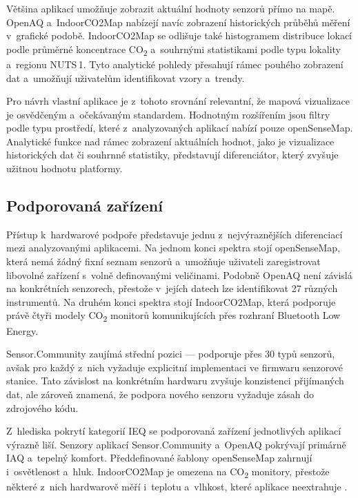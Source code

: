 Většina aplikací umožňuje zobrazit aktuální hodnoty senzorů přímo na mapě. OpenAQ a~IndoorCO2Map nabízejí navíc zobrazení historických průběhů měření v~grafické podobě. IndoorCO2Map se odlišuje také histogramem distribuce lokací podle průměrné koncentrace CO\textsubscript{2} a~souhrnými statistikami podle typu lokality a~regionu NUTS\,1. Tyto analytické pohledy přesahují rámec pouhého zobrazení dat a~umožňují uživatelům identifikovat vzory a~trendy.

Pro návrh vlastní aplikace je z~tohoto srovnání relevantní, že mapová vizualizace je osvědčeným a~očekávaným standardem. Hodnotným rozšířením jsou filtry podle typu prostředí, které z~analyzovaných aplikací nabízí pouze openSenseMap. Analytické funkce nad rámec zobrazení aktuálních hodnot, jako je vizualizace historických dat či souhrnné statistiky, představují diferenciátor, který zvyšuje užitnou hodnotu platformy.

\FloatBarrier
\subsection{Podporovaná zařízení}

Přístup k~hardwarové podpoře představuje jednu z~nejvýraznějších diferenciací mezi analyzovanými aplikacemi. Na jednom konci spektra stojí openSenseMap, která nemá žádný fixní seznam senzorů a~umožňuje uživateli zaregistrovat libovolné zařízení s~volně definovanými veličinami. Podobně OpenAQ není závislá na konkrétních senzorech, přestože v~jejích datech lze identifikovat 27 různých instrumentů. Na druhém konci spektra stojí IndoorCO2Map, která podporuje právě čtyři modely CO\textsubscript{2} monitorů komunikujících přes rozhraní Bluetooth Low Energy.

Sensor.Community zaujímá střední pozici --- podporuje přes 30 typů senzorů, avšak pro každý z~nich vyžaduje explicitní implementaci ve firmwaru senzorové stanice. Tato závislost na konkrétním hardwaru zvyšuje konzistenci přijímaných dat, ale zároveň znamená, že podpora nového senzoru vyžaduje zásah do zdrojového kódu.

Z~hlediska pokrytí kategorií IEQ se podporovaná zařízení jednotlivých aplikací výrazně liší. Senzory aplikací Sensor.Community a~OpenAQ pokrývají primárně IAQ a~tepelný komfort. Předdefinované šablony openSenseMap zahrnují i~osvětlenost a~hluk. IndoorCO2Map je omezena na CO\textsubscript{2} monitory, přestože některé z~nich hardwarově měří i~teplotu a~vlhkost, které aplikace neextrahuje \parencite{aurelwuAurelWuIndoorCO2MapApp2026}.

